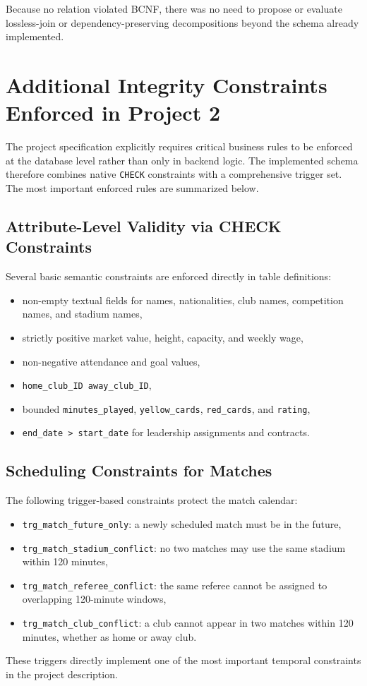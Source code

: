 \documentclass[12pt,a4paper]{article}
\begin{document}
Because no relation violated BCNF, there was no need to propose or evaluate lossless-join or dependency-preserving decompositions beyond the schema already implemented.

\section{Additional Integrity Constraints Enforced in Project 2}
The project specification explicitly requires critical business rules to be enforced at the database level rather than only in backend logic. The implemented schema therefore combines native \texttt{CHECK} constraints with a comprehensive trigger set. The most important enforced rules are summarized below.

\subsection{Attribute-Level Validity via CHECK Constraints}
Several basic semantic constraints are enforced directly in table definitions:
\begin{itemize}
    \item non-empty textual fields for names, nationalities, club names, competition names, and stadium names,
    \item strictly positive market value, height, capacity, and weekly wage,
    \item non-negative attendance and goal values,
    \item \texttt{home\_club\_ID \neq away\_club\_ID},
    \item bounded \texttt{minutes\_played}, \texttt{yellow\_cards}, \texttt{red\_cards}, and \texttt{rating},
    \item \texttt{end\_date > start\_date} for leadership assignments and contracts.
\end{itemize}

\subsection{Scheduling Constraints for Matches}
The following trigger-based constraints protect the match calendar:
\begin{itemize}
    \item \texttt{trg\_match\_future\_only}: a newly scheduled match must be in the future,
    \item \texttt{trg\_match\_stadium\_conflict}: no two matches may use the same stadium within 120 minutes,
    \item \texttt{trg\_match\_referee\_conflict}: the same referee cannot be assigned to overlapping 120-minute windows,
    \item \texttt{trg\_match\_club\_conflict}: a club cannot appear in two matches within 120 minutes, whether as home or away club.
\end{itemize}
These triggers directly implement one of the most important temporal constraints in the project description.
\end{document}
